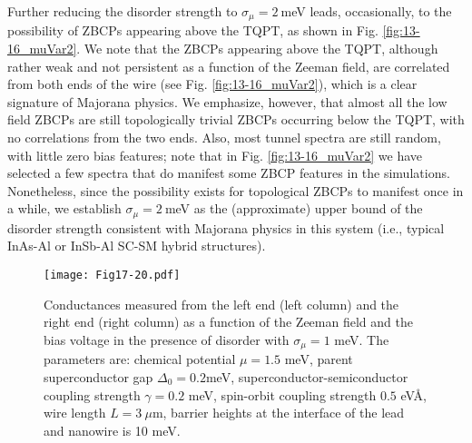 \documentclass[aps,prmaterials,twocolumn,superscriptaddress,longbibliography]{revtex4-2}
\begin{document}
Further reducing the disorder strength to $\sigma_\mu = 2~$meV leads, occasionally, to the possibility of ZBCPs appearing above the TQPT, as shown in Fig. \ref{fig:13-16_muVar2}. We note that the ZBCPs appearing above the TQPT, although rather weak and not persistent as a function of the Zeeman field, are correlated from both ends of the wire (see Fig. \ref{fig:13-16_muVar2}), which is a clear signature of Majorana physics. 
 We emphasize, however, that almost all the low field ZBCPs are still topologically trivial ZBCPs occurring below the TQPT, with no correlations from the two ends. Also, most tunnel spectra are still random, with little zero bias features; note that in Fig. \ref{fig:13-16_muVar2} we have selected a few spectra that do manifest some ZBCP features in the simulations. Nonetheless, since the possibility exists for topological ZBCPs to manifest once in a while, we establish $\sigma_\mu = 2~$meV as the (approximate) upper bound of the disorder strength consistent with Majorana physics in this system (i.e., typical InAs-Al or InSb-Al SC-SM hybrid structures). 

\begin{figure}[t]
    \centering
    \texttt{[image: Fig17-20.pdf]}
    \caption{Conductances measured from the left end (left column) and the right end (right column) as a function of the Zeeman field and the bias voltage in the presence of disorder with $\sigma_\mu=1$ meV. The parameters are: chemical potential $\mu=1.5$ meV, parent superconductor gap $\Delta_0=0.2 $meV, superconductor-semiconductor coupling strength $\gamma=0.2$ meV, spin-orbit coupling strength $0.5$ eV\AA, wire length $L=3~\mu$m, barrier heights at the interface of the lead and nanowire is 10 meV.}
    \label{fig:17-20_muVar1}
\end{figure}
\end{document}
